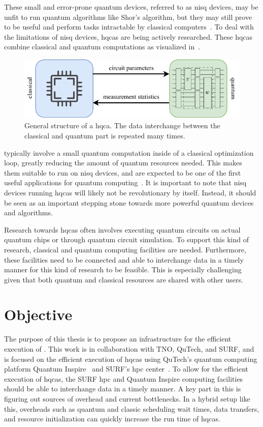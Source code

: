 These small and error-prone quantum devices, referred to as \gls{nisq} devices, may be unfit to run quantum algorithms like Shor's algorithm, but they may still prove to be useful and perform tasks intractable by classical computers~\cite{preskill2018quantum}.
To deal with the limitations of \gls{nisq} devices, \glspl{hqca} are being actively researched.
These \glspl{hqca} combine classical and quantum computations as visualized in~.
\begin{figure}[ht]
    \centering
    \includegraphics[width=0.7\linewidth]{figures/hybrid-quantum-algorithm.pdf}
    \caption[General structure of a \acrshort{hqca}.]{
        General structure of a \gls{hqca}.
        The data interchange between the classical and quantum part is repeated many times.
    }
    \label{fig:hybrid-quantum-classical}
\end{figure}
 typically involve a small quantum computation inside of a classical optimization loop, greatly reducing the amount of quantum resources needed.
This makes them suitable to run on \gls{nisq} devices, and are expected to be one of the first useful applications for quantum computing~\cite{endo2021hybrid}.
It is important to note that \gls{nisq} devices running \glspl{hqca} will likely not be revolutionary by itself.
Instead, it should be seen as an important stepping stone towards more powerful quantum devices and algorithms.

Research towards \glspl{hqca} often involves executing quantum circuits on actual quantum chips or through quantum circuit simulation.
To support this kind of research, classical and quantum computing facilities are needed.
Furthermore, these facilities need to be connected and able to interchange data in a timely manner for this kind of research to be feasible.
This is especially challenging given that both quantum and classical resources are shared with other users.

\section{Objective}
The purpose of this thesis is to propose an infrastructure for the efficient execution of .
This work is in collaboration with TNO, QuTech, and SURF, and is focused on the efficient execution of \glspl{hqca} using QuTech's quantum computing platform Quantum Inspire~\cite{quantuminspire} and SURF's \gls{hpc} center~\cite{surf}.
To allow for the efficient execution of \glspl{hqca}, the SURF \gls{hpc} and Quantum Inspire computing facilities should be able to interchange data in a timely manner.
A key part in this is figuring out sources of overhead and current bottlenecks.
In a hybrid setup like this, overheads such as quantum and classic scheduling wait times, data transfers, and resource initialization can quickly increase the run time of \glspl{hqca}.

